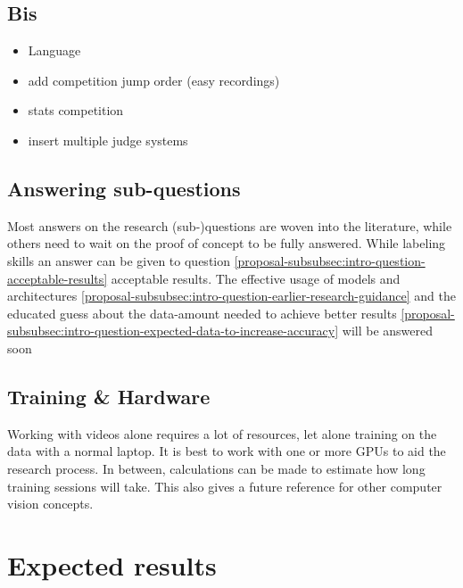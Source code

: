 \subsection{Bis}

\begin{itemize}
    \item Language
    \item add competition jump order (easy recordings)
    \item stats competition
    \item insert multiple judge systems
\end{itemize}



\subsection{Answering sub-questions}
\label{proposal-subsec:methodology-sub-questions}



Most answers on the research (sub-)questions are woven into the literature, while others need to wait on the proof of concept to be fully answered.
While labeling skills an answer can be given to question \ref{proposal-subsubsec:intro-question-acceptable-results} acceptable results. The effective usage of models and architectures \ref{proposal-subsubsec:intro-question-earlier-research-guidance} and the educated guess about the data-amount needed to achieve better results \ref{proposal-subsubsec:intro-question-expected-data-to-increase-accuracy} will be answered soon


\subsection{Training \& Hardware}

Working with videos alone requires a lot of resources, let alone training on the data with a normal laptop. It is best to work with one or more GPUs to aid the research process. In between, calculations can be made to estimate how long training sessions will take. This also gives a future reference for other computer vision concepts.


\section{Expected results}
\label{proposal-sec:verwachte-resultaten}

